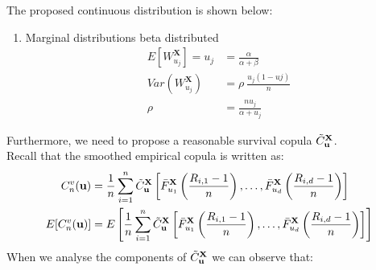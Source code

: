 \documentclass[12pt]{report}
\newcommand{\1}{\mathbf{1}}
\begin{document}
\begin{flushleft}
\newpage
The proposed continuous distribution is shown below:
\begin{enumerate}
\item Marginal distributions beta distributed
\begin{align*}
E[W^{\textbf{X}}_{u_{j}}] = u_{j} &= \frac{\alpha}{\alpha + \beta} \\
Var(W^{\textbf{X}}_{u_{j}}) &= \rho \: \frac{u_{j} (1 - u{j})}{n}\\
\rho &= \frac{n u_{j}}{\alpha + u_{j}}
\end{align*}
\end{enumerate}

Furthermore, we need to propose a reasonable survival copula $\Tilde{C}_{\textbf{u}}^{\textbf{X}}$. \\
\vspace{0.5cm}
Recall that the smoothed empirical copula is written as:
\begin{align*}
C_{n}^{v}(\textbf{u}) &= \frac{1}{n} \sum\limits_{i = 1}^{n} \Tilde{C}_{\textbf{u}}^{\textbf{X}} \left[\Bar{F}_{u_{1}}^{\textbf{X}}\left(\frac{R_{i,1} - 1}{n}\right), \dots, \Bar{F}_{u_{d}}^{\textbf{X}}\left(\frac{R_{i,d} - 1}{n}\right) \right]\\
E[C_{n}^{v}(\textbf{u})] &= E \left[ \frac{1}{n} \sum\limits_{i = 1}^{n} \Tilde{C}_{\textbf{u}}^{\textbf{X}} \left[\Bar{F}_{u_{1}}^{\textbf{X}}\left(\frac{R_{i,1} - 1}{n}\right), \dots, \Bar{F}_{u_{d}}^{\textbf{X}}\left(\frac{R_{i,d} - 1}{n}\right) \right] \right]
\end{align*}
When we analyse the components of $\Tilde{C}_{\textbf{u}}^{\textbf{X}}$ \parencite{KojadinovicYi2024Smooth} we can observe that:


\end{flushleft}
\end{document}
